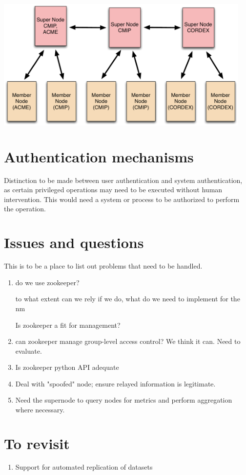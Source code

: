 \documentclass[oneside,12pt]{memoir}
\begin{document}
\begin{center}
\includegraphics[width=5in]{presentation/ESG-node-org.pdf}
\end{center}


\section{Authentication mechanisms}
Distinction to be made between user authentication and system authentication, as certain privileged operations may need to be executed without human intervention. This would need a system or process to be authorized to perform the operation. 
\section{Issues and questions}
This is to be a place to list out problems that need to be handled.
\begin{enumerate}
\item
do we use zookeeper?

to what extent can we rely if we do,  what do we need to implement for the nm


Is zookeeper a fit for management?
\item
can zookeeper manage group-level access control?  We think it can.  Need to evaluate.
\item
Is zookeeper python API adequate

\item
Deal with "spoofed" node; ensure relayed information is legitimate. 
\item
Need the supernode to query nodes for metrics and perform aggregation where necessary.

\end{enumerate}
\section{To revisit}
\begin{enumerate}
\item Support for automated replication of datasets
\end{enumerate}
\printbibliography
\hypertarget{mymarker}{}
\printindex
\end{document}
